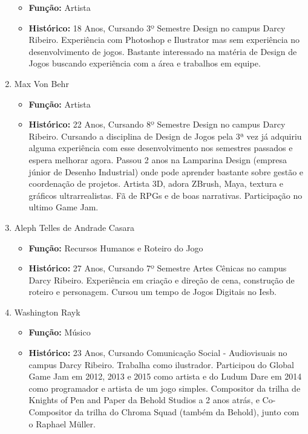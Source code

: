 \documentclass[a4paper, 11pt]{article} %
\begin{document}
\begin{enumerate}
\begin{itemize}
\item \textbf{Função:} Artista
\item \textbf{Histórico:} 18 Anos, Cursando 3º Semestre Design no campus Darcy Ribeiro. Experiência com Photoshop e Ilustrator mas sem experiência no desenvolvimento de jogos. Bastante interessado na matéria de Design de Jogos buscando experiência com a área e trabalhos em equipe.
\end{itemize}

\item Max Von Behr

\begin{itemize}
\item \textbf{Função:} Artista
\item \textbf{Histórico:} 22 Anos, Cursando 8º Semestre Design no campus Darcy Ribeiro. Cursando a disciplina de Design de Jogos pela 3ª vez já adquiriu alguma experiência com esse desenvolvimento nos semestres passados e espera melhorar agora. Passou 2 anos na Lamparina Design (empresa júnior de Desenho Industrial) onde pode aprender bastante sobre gestão e coordenação de projetos. Artista 3D, adora ZBrush, Maya, textura e gráficos ultrarrealistas. Fã de RPGs e de boas narrativas. Participação no ultimo Game Jam. 
\end{itemize}

\item Aleph Telles de Andrade Casara

\begin{itemize}
\item \textbf{Função:} Recursos Humanos e Roteiro do Jogo
\item \textbf{Histórico:} 27 Anos, Cursando 7º Semestre Artes Cênicas no campus Darcy Ribeiro. Experiência em criação e direção de cena, construção de roteiro e personagem. Cursou um tempo de Jogos Digitais no Iesb.  
\end{itemize}

\item Washington Rayk

\begin{itemize}
\item \textbf{Função:} Músico
\item \textbf{Histórico:} 23 Anos, Cursando Comunicação Social - Audiovisuais no campus Darcy Ribeiro. Trabalha como ilustrador. Participou do Global Game Jam em 2012, 2013 e 2015 como artista e do Ludum Dare em 2014 como programador e artista de um jogo simples. Compositor da trilha de Knights of Pen and Paper  da Behold Studios a 2 anos atrás, e Co-Compositor da trilha do Chroma Squad (também da Behold), junto com o Raphael Müller.
\end{itemize}
\end{enumerate}
\end{document}
